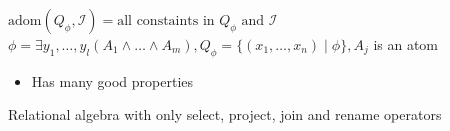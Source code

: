 \begin{itemize}
     $\text{adom}(Q_\phi, \mathcal{I}) = \text{all constaints in } Q_\phi \text{ and } \mathcal{I}$
     $\phi = \exists y_1, \dots, y_l (A_1 \wedge \dots \wedge A_m), Q_\phi = \{(x_1, \dots, x_n) \mid \phi \}, A_j$ is an atom
        \begin{itemize}
            \item Has many good properties
        \end{itemize}
     Relational algebra with only select, project, join and rename operators
\end{itemize}

